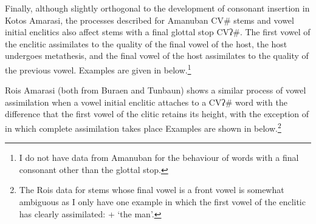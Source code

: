 \newpage
Finally, although slightly orthogonal to the development
of consonant insertion in Kotos Amarasi,
the processes described for Amanuban CV{\#}
stems and vowel initial enclitics also affect stems
with a final glottal stop CVʔ{\#}.
The first vowel of the enclitic assimilates to the quality
of the final vowel of the host, the host undergoes metathesis,
and the final vowel of the host assimilates to the quality of the previous vowel.
Examples are given in  below.\footnote{
		I do not have data from Amanuban for the behaviour
		of words with a final consonant other than the glottal stop.}

\begin{exe}
	\label{ex:AmaVowAssGlot}
\end{exe}

Ro{\Q}is Amarasi (both from Buraen and Tunbaun)
shows a similar process of vowel assimilation when a vowel
initial enclitic attaches to a CVʔ{\#} word with
the difference that the first vowel of the clitic retains its height,
with the exception of  in which complete assimilation takes place
Examples are shown in  below.\footnote{
		The Ro{\Q}is data for stems whose final vowel is a front vowel
		is somewhat ambiguous as I only have one example
		in which the first vowel of the enclitic has clearly assimilated:
		 +  {\ra}  `the man'.}


